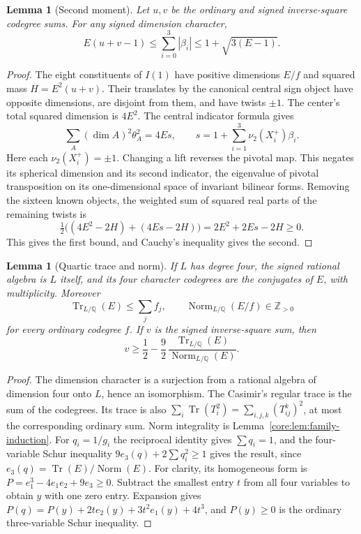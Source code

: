 \documentclass[11pt,a4paper]{article}
\newtheorem{lemma}[theorem]{Lemma}
\theoremstyle{definition}\newtheorem{definition}[theorem]{Definition}
\theoremstyle{remark}\newtheorem{remark}[theorem]{Remark}
\DeclareMathOperator{\Tr}{Tr}
\newcommand{\Q}{\mathbb Q}
\newcommand{\ZZ}{\mathbb Z}
\DeclareMathOperator{\Norm}{Norm}
\numberwithin{equation}{section}
\begin{document}
\begin{lemma}[Second moment]\label{core:lem:family-signed-second}
Let $u,v$ be the ordinary and signed inverse-square codegree sums.
For any signed dimension character,
\[
 E(u+v-1)\le\sum_{i=0}^3|\beta_i|
 \le1+\sqrt{3(E-1)}.
\]
\end{lemma}
\begin{proof}
The eight constituents of $I(1)$ have positive dimensions $E/f$
and squared mass $H=E^2(u+v)$. Their translates by the canonical
central sign object have opposite dimensions, are disjoint from
them, and have twists $\pm1$. The center's total squared dimension
is $4E^2$. The central indicator formula
\cite[Theorem~4.1]{NS} gives
\[
 \sum_A (\dim A)^2\theta_A^2=4Es,
 \qquad s=1+\sum_{i=1}^3\nu_2(X_i^+)\beta_i.
\]
Here each $\nu_2(X_i^+)=\pm1$. Changing a lift reverses the pivotal
map. This negates its spherical dimension and its second indicator,
the eigenvalue of pivotal transposition on its one-dimensional
space of invariant bilinear forms. Removing the sixteen
known objects, the weighted sum of squared real parts of the
remaining twists is
\[
 \tfrac12\bigl((4E^2-2H)+(4Es-2H)\bigr)
 =2E^2+2Es-2H\ge0.
\]
This gives the first bound, and Cauchy's inequality gives the second.
\end{proof}
\begin{lemma}[Quartic trace and norm]\label{core:lem:family-trace-norm}
If $L$ has degree four, the signed rational algebra is $L$ itself,
and its four character codegrees are the conjugates of $E$, with
multiplicity. Moreover
\[
 \Tr_{L/\Q}(E)\le\sum_j f_j,
 \qquad \Norm_{L/\Q}(E/f)\in\ZZ_{>0}
\]
for every ordinary codegree $f$. If $v$ is the signed inverse-square
sum, then
\[
 v\ge\frac12-\frac92\,
 \frac{\Tr_{L/\Q}(E)}{\Norm_{L/\Q}(E)}.
\]
\end{lemma}
\begin{proof}
The dimension character is a surjection from a rational algebra of
dimension four onto $L$, hence an isomorphism. The Casimir's regular
trace is the sum of the codegrees. Its trace is also
$\sum_i\Tr(T_i^2)=\sum_{i,j,k}(T_{ij}^k)^2$, at most the
corresponding ordinary sum. Norm integrality is
Lemma~\ref{core:lem:family-induction}. For $q_i=1/g_i$ the reciprocal
identity gives $\sum q_i=1$, and the four-variable
Schur inequality $9e_3(q)+2\sum q_i^2\ge1$ gives the result,
since $e_3(q)=\Tr(E)/\Norm(E)$. For clarity, its homogeneous
form is $P=e_1^3-4e_1e_2+9e_3\ge0$. Subtract the smallest entry
$t$ from all four variables to obtain $y$ with one zero entry.
Expansion gives
$P(q)=P(y)+2t e_2(y)+3t^2e_1(y)+4t^3$, and $P(y)\ge0$ is the
ordinary three-variable Schur inequality.
\end{proof}
\end{document}

